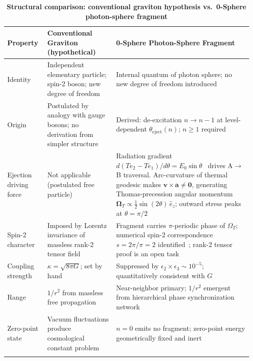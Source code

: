 \documentclass[%
 reprint, amsmath,amssymb, aps, prb, ]{revtex4-2}
\numberwithin{equation}{section}
\newcommand{\iphase}{\theta}
\begin{document}
\begin{table}[t!]
\centering
\caption{\textbf{Structural comparison: conventional graviton hypothesis vs.\ 0-Sphere photon-sphere fragment}}
\label{tab:graviton_comparison}
\renewcommand{\arraystretch}{1.4}
\normalsize
\begin{tabular}{p{3.8cm}p{5.5cm}p{5.7cm}}
\toprule
\textbf{Property} & \textbf{Conventional Graviton (hypothetical)} & \textbf{0-Sphere Photon-Sphere Fragment} \\
\midrule
Identity
& Independent elementary particle; spin-2 boson; new degree of freedom
& Internal quantum of photon sphere; no new degree of freedom introduced \\
\addlinespace[0.3cm]
Origin
& Postulated by analogy with gauge bosons; no derivation from simpler structure
& Derived: de-excitation $n \to n-1$ at level-dependent $\iphase_{\text{eject}}(n)$; $n \geq 1$ required \\
\addlinespace[0.3cm]
Ejection driving force
& Not applicable (postulated free particle)
& Radiation gradient $d(Te_2 - Te_1)/d\theta = E_0\sin\theta$~\cite{hanamura01} drives A$\to$B traversal. Arc-curvature of thermal geodesic makes $\mathbf{v} \times \mathbf{a} \neq \mathbf{0}$, generating Thomas-precession angular momentum $\boldsymbol{\Omega}_T \propto \tfrac{1}{2}\sin(2\theta)\,\hat{e}_z$; outward stress peaks at $\theta=\pi/2$ \\
\addlinespace[0.3cm]
Spin-2 character
& Imposed by Lorentz invariance of massless rank-2 tensor field
& Fragment carries $\pi$-periodic phase of $\Omega_T$; numerical spin-2 correspondence $s = 2\pi/\pi = 2$ identified~\cite{hanamura48}; rank-2 tensor proof is an open task \\
\addlinespace[0.3cm]
Coupling strength
& $\kappa = \sqrt{8\pi G}$; set by hand
& Suppressed by $\epsilon_2\times\epsilon_3 \sim 10^{-5}$; quantitatively consistent with $G$~\cite{hanamura34} \\
\addlinespace[0.3cm]
Range
& $1/r^2$ from massless free propagation
& Near-neighbor primary; $1/r^2$ emergent from hierarchical phase synchronization network \\
\addlinespace[0.3cm]
Zero-point state
& Vacuum fluctuations produce cosmological constant problem
& $n=0$ emits no fragment; zero-point energy geometrically fixed and inert \\
\addlinespace[0.2cm]
\bottomrule
\end{tabular}
\vspace{0.2cm}

\end{table}
\end{document}
